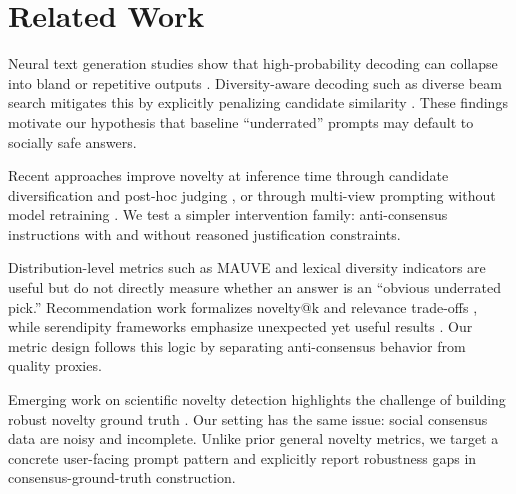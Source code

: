 \section{Related Work}
\label{sec:related_work}
 Neural text generation studies show that high-probability decoding can collapse into bland or repetitive outputs \citep{holtzman2019curious}. Diversity-aware decoding such as diverse beam search mitigates this by explicitly penalizing candidate similarity \citep{vijayakumar2016diverse}. These findings motivate our hypothesis that baseline ``underrated'' prompts may default to socially safe answers.

 Recent approaches improve novelty at inference time through candidate diversification and post-hoc judging \citep{franceschelli2024creative}, or through multi-view prompting without model retraining \citep{lagzian2025multinovelty}. We test a simpler intervention family: anti-consensus instructions with and without reasoned justification constraints.

 Distribution-level metrics such as MAUVE \citep{pillutla2021mauve} and lexical diversity indicators are useful but do not directly measure whether an answer is an ``obvious underrated pick.'' Recommendation work formalizes novelty@k and relevance trade-offs \citep{sharma2024optimizing}, while serendipity frameworks emphasize unexpected yet useful results \citep{xi2025seral,yong2025dynamic}. Our metric design follows this logic by separating anti-consensus behavior from quality proxies.

 Emerging work on scientific novelty detection highlights the challenge of building robust novelty ground truth \citep{liu2025novelty}. Our setting has the same issue: social consensus data are noisy and incomplete. Unlike prior general novelty metrics, we target a concrete user-facing prompt pattern and explicitly report robustness gaps in consensus-ground-truth construction.
